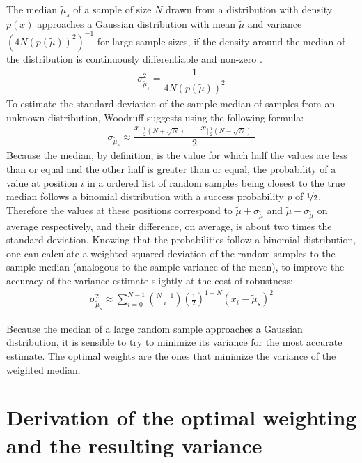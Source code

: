 \documentclass[ejs]{imsart}
\numberwithin{equation}{section}
\theoremstyle{plain}
\begin{document}
The median $\tilde{\mu}_s$ of a sample of size $N$ drawn from a distribution with density $p(x)$ approaches a Gaussian distribution with mean $\tilde{\mu}$ and variance $\left(4 N \left(p\left(\tilde{\mu}\right)\right)^2\right)^{-1}$ for large sample sizes, if the density around the median of the distribution is continuously differentiable and non-zero \cite[Supp.~mat.]{MILLER2017} \cite{doi:10.1080/01621459.1960.10482056}.
\begin{align}
\sigma^2_{\tilde{\mu}_s} = \dfrac{1}{4 N \left(p\left(\tilde{\mu}\right)\right)^2} \label{median_density_variance}
\end{align}
To estimate the standard deviation of the sample median of samples from an unknown distribution, Woodruff\cite{Woodruff1952} suggests using the following formula:
\begin{align}
\sigma_{\tilde{\mu}_s} \approx \dfrac{ x_{\lceil \frac{1}{2}\left(N+\sqrt{N}\right) \rceil} - x_{\lfloor \frac{1}{2}\left(N-\sqrt{N}\right) \rfloor} }{2} \label{standard_deviation_median}
\end{align}
Because the median, by definition, is the value for which half the values are less than or equal and the other half is greater than or equal, the probability of a value at position $i$ in a ordered list of random samples being closest to the true median follows a binomial distribution with a success probability $p$ of $\nicefrac{1}{2}$.
Therefore the values at these positions correspond to $\tilde{\mu}+\sigma_{\tilde{\mu}}$ and $\tilde{\mu}-\sigma_{\tilde{\mu}}$ on average respectively, and their difference, on average, is about two times the standard deviation.
Knowing that the probabilities follow a binomial distribution, one can calculate a weighted squared deviation of the random samples to the sample median (analogous to the sample variance of the mean), to improve the accuracy of the variance estimate slightly at the cost of robustness:
\begin{align}
\sigma^2_{\tilde{\mu}_s} \approx \sum_{i=0}^{N-1} {N-1 \choose i} \left(\frac{1}{2}\right)^{1-N} \left(x_i - \tilde{\mu}_s\right)^2 \label{variance_median}
\end{align}

Because the median of a large random sample approaches a Gaussian distribution, it is sensible to try to minimize its variance for the most accurate estimate.
The optimal weights are the ones that minimize the variance of the weighted median.

\section{Derivation of the optimal weighting and the resulting variance}
\end{document}

